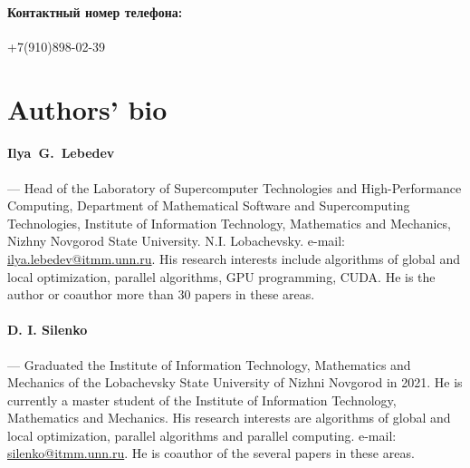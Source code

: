 \documentclass[12pt, a4paper, russian]{article}
\begin{document}
\paragraph{Контактный номер телефона:}{+7(910)898-02-39}

\section*{Authors' bio}

\paragraph{Ilya~G.~Lebedev} --- Head of the Laboratory of Supercomputer Technologies and High-Performance Computing, Department of Mathematical Software and Supercomputing Technologies, Institute of Information Technology, Mathematics and Mechanics, Nizhny Novgorod State University. N.I. Lobachevsky. e-mail: \url{ilya.lebedev@itmm.unn.ru}. His research interests include algorithms of global and local optimization, parallel algorithms, GPU programming, CUDA. He is the author or coauthor more than 30 papers in these areas.



\paragraph{D. I. Silenko} --- Graduated the Institute of Information Technology, Mathematics and Mechanics of the Lobachevsky State University of Nizhni Novgorod in 2021. He is currently a master student of the Institute of Information Technology, Mathematics and Mechanics. His research interests are algorithms of global and local optimization, parallel algorithms and parallel computing. e-mail: \url{silenko@itmm.unn.ru}. He is coauthor of the several papers in these areas.
\end{document}
